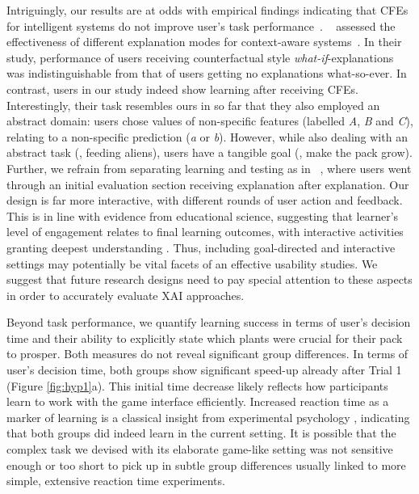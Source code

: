 {%
Intriguingly, our results are at odds with empirical findings indicating that \glspl{CFE} for intelligent systems do not improve user's task performance~\citep{lim_why_2009, van_der_waa_evaluating_2021}.
~\citeauthor{lim_why_2009} assessed the effectiveness of different explanation modes for context-aware systems~\citep{lim_why_2009}. 
In their study, performance of users receiving counterfactual style \textit{what-if}-explanations was indistinguishable from that of users getting no explanations what-so-ever.
In contrast, users in our study indeed show learning after receiving \glspl{CFE}.
Interestingly, their task resembles ours in so far that they also employed an abstract domain: users chose values of non-specific features (labelled \textit{A}, \textit{B} and \textit{C}), relating to a non-specific prediction (\textit{a} or \textit{b}).
However, while also dealing with an abstract task (\ie, feeding aliens), users have a tangible goal (\ie, make the pack grow).
Further, we refrain from separating learning and testing as in ~\citeauthor{lim_why_2009}, where users went through an initial evaluation section receiving explanation after explanation.
Our design is far more interactive, with different rounds of user action and feedback.
This is in line with evidence from educational science, suggesting that learner's level of engagement relates to final learning outcomes, with interactive activities granting deepest understanding \citep{chi_icap_2014}.
Thus, including goal-directed and interactive settings may potentially be vital facets of an effective usability studies. 
We suggest that future research designs need to pay special attention to these aspects in order to accurately evaluate \gls{XAI} approaches.

Beyond task performance, we quantify learning success in terms of user's decision time and their ability to explicitly state which plants were crucial for their pack to prosper. %
Both measures do not reveal significant group differences.
In terms of user's decision time, both groups show significant speed-up already after Trial 1 (Figure \ref{fig:hyp1}a).
This initial time decrease likely reflects how participants learn to work with the game interface efficiently.
Increased reaction time as a marker of learning is a classical insight from experimental psychology \citep{logan_shapes_1992}, indicating that both groups did indeed learn in the current setting. 
It is possible that the complex task we devised with its elaborate game-like setting was not sensitive enough or too short to pick up in subtle group differences usually linked to more simple, extensive reaction time experiments.

}
